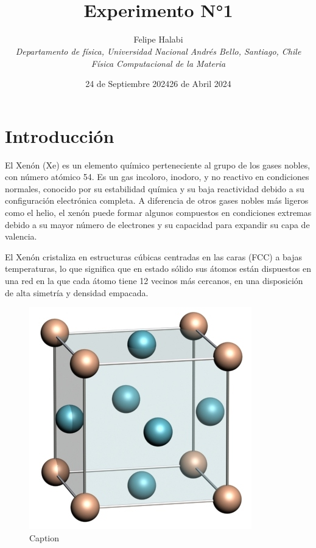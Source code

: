 \documentclass[10pt,letterpaper,twocolumn]{article}
\title{\noindent\\[-4cm]\bfseries Experimento N°1}
\author{Felipe Halabi
\\\small\itshape \textit{Departamento de física, Universidad Nacional Andrés Bello, Santiago, Chile}
\\\small\itshape Física Computacional de la Materia}
\date{24 de Septiembre 2024}
\date{26 de Abril 2024}
\begin{document}
\renewcommand{\tablename}{Tabla}
\section*{Introducción}
El Xenón (Xe) es un elemento químico perteneciente al grupo de los gases nobles, con número atómico 54. Es un gas incoloro, inodoro, y no reactivo en condiciones normales, conocido por su estabilidad química y su baja reactividad debido a su configuración electrónica completa. A diferencia de otros gases nobles más ligeros como el helio, el xenón puede formar algunos compuestos en condiciones extremas debido a su mayor número de electrones y su capacidad para expandir su capa de valencia.

El Xenón cristaliza en estructuras cúbicas centradas en las caras (FCC) a bajas temperaturas, lo que significa que en estado sólido sus átomos están dispuestos en una red en la que cada átomo tiene 12 vecinos más cercanos, en una disposición de alta simetría y densidad empacada.

 \begin{figure}[h]
     \centering
     \includegraphics[width=0.3\linewidth]{FCCStructure.jpg}
     \caption{Caption}
     \label{fig:enter-label}
 \end{figure}
\end{document}

